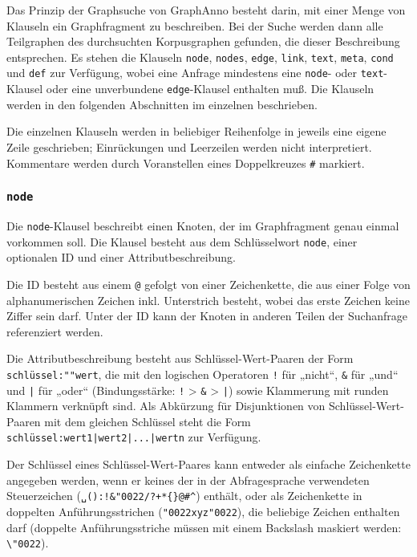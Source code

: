 \documentclass[12pt]{scrartcl}
\newcommand{\quo}{\char"0022}
\begin{document}
Das Prinzip der Graphsuche von GraphAnno besteht darin, mit einer Menge von Klauseln ein Graphfragment zu beschreiben. Bei der Suche werden dann alle Teilgraphen des durchsuchten Korpusgraphen gefunden, die dieser Beschreibung entsprechen.
Es stehen die Klauseln \texttt{node}, \texttt{nodes}, \texttt{edge}, \texttt{link}, \texttt{text}, \texttt{meta}, \texttt{cond} und \texttt{def} zur Verfügung, wobei eine Anfrage mindestens eine \texttt{node}- oder \texttt{text}-Klausel oder eine unverbundene \texttt{edge}-Klausel enthalten muß. Die Klauseln werden in den folgenden Abschnitten im einzelnen beschrieben.

Die einzelnen Klauseln werden in beliebiger Reihenfolge in jeweils eine eigene Zeile geschrieben; Einrückungen und Leerzeilen werden nicht interpretiert. Kommentare werden durch Voranstellen eines Doppelkreuzes \texttt{\#} markiert.



\subsubsection{\texttt{node}}\label{node}

Die \texttt{node}-Klausel beschreibt einen Knoten, der im Graphfragment genau einmal vorkommen soll. Die Klausel besteht aus dem Schlüsselwort \texttt{node}, einer optionalen ID und einer Attributbeschreibung.

Die ID besteht aus einem \texttt{@} gefolgt von einer Zeichenkette, die aus einer Folge von alphanumerischen Zeichen inkl. Unterstrich besteht, wobei das erste Zeichen keine Ziffer sein darf. Unter der ID kann der Knoten in anderen Teilen der Suchanfrage referenziert werden.

Die Attributbeschreibung besteht aus Schlüssel-Wert-Paaren der Form \texttt{schlüssel:""wert}, die mit den logischen Operatoren \texttt{!} für „nicht“, \texttt{\&} für „und“ und \texttt{|} für „oder“ (Bindungsstärke: \texttt{!} > \texttt{\&} > \texttt{|}) sowie Klammerung mit runden Klammern verknüpft sind. Als Abkürzung für Disjunktionen von Schlüssel-Wert-Paaren mit dem gleichen Schlüssel steht die Form \texttt{schlüssel:wert1|wert2|...|wertn} zur Verfügung.

Der Schlüssel eines Schlüssel-Wert-Paares kann entweder als einfache Zeichenkette angegeben werden, wenn er keines der in der Abfragesprache verwendeten Steuerzeichen (\texttt{␣():!\&\quo/?+*\{\}@\#\^{}}) enthält, oder als Zeichenkette in doppelten Anführungsstrichen (\texttt{{\quo}xyz\quo}), die beliebige Zeichen enthalten darf (doppelte Anführungsstriche müssen mit einem Backslash maskiert werden: \texttt{\textbackslash\quo}).
\end{document}
